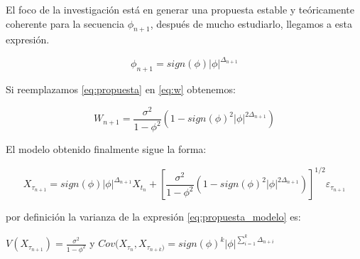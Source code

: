 El foco de la investigación está en generar una propuesta estable y teóricamente coherente para la secuencia $\phi_{n+1}$, después de mucho estudiarlo, llegamos a esta expresión.

\begin{equation}
\phi_{n+1} = sign(\phi)|\phi|^{\Delta_{n+1}}
\label{eq:propuesta}
\end{equation}

Si reemplazamos \ref{eq:propuesta} en \ref{eq:w} obtenemos:

\begin{equation}
W_{n+1} = \frac{\sigma^2}{1-\phi^2} \left(1-sign(\phi)^2 |\phi|^{2\Delta_{n+1}}\right)
\label{eq:w}
\end{equation}

El modelo obtenido finalmente sigue la forma:

\begin{equation}
X_{\tau_{n+1}} = sign(\phi)|\phi|^{\Delta_{n+1}} X_{t_n} + \left[\frac{\sigma^2}{1-\phi^2} \left(1-sign(\phi)^2 |\phi|^{2\Delta_{n+1}}\right)\right]^{1/2} \varepsilon_{\tau_{n+1}}
\label{eq:propuesta_modelo}
\end{equation}
 
por definición la varianza de la expresión \ref{eq:propuesta_modelo} es:

 $V(X_{\tau_{n+1}}) =  \frac{\sigma^2}{1-\phi^2}$ y $Cov(X_{\tau_n}, X_{\tau_{n+k})} = sign(\phi)^k|\phi|^{\sum_{i=1}^{k}\Delta_{n+i}}$


